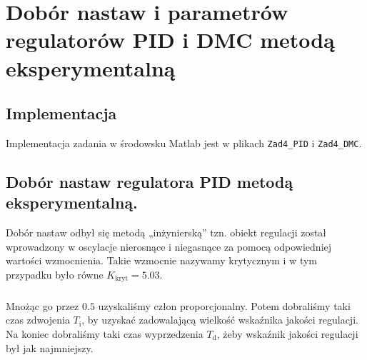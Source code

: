 \chapter{Dobór nastaw i parametrów regulatorów PID i DMC metodą eksperymentalną}
    \section{Implementacja}
    Implementacja zadania w środowsku Matlab jest w plikach \texttt{Zad4\_PID} i \texttt{Zad4\_DMC}.
    \section{Dobór nastaw regulatora PID metodą eksperymentalną.}
    Dobór nastaw odbył się metodą „inżynierską” tzn. obiekt regulacji został wprowadzony w oscylacje nierosnące i niegasnące za pomocą odpowiedniej wartości wzmocnienia. Takie wzmocnie nazywamy krytycznym i w tym przypadku było równe $K_{\mathrm{kryt}}=\num{5,03}$. 
    


    \paragraph{}
    Mnożąc go przez $\num{0,5}$ uzyskaliśmy człon proporcjonalny. Potem dobraliśmy taki czas zdwojenia $T_{\mathrm{i}}$, by uzyskać zadowalającą wielkość wskaźnika jakości regulacji. Na koniec dobraliśmy taki czas wyprzedzenia $T_{\mathrm{d}}$, żeby wskaźnik jakości regulacji był jak najmniejszy.
